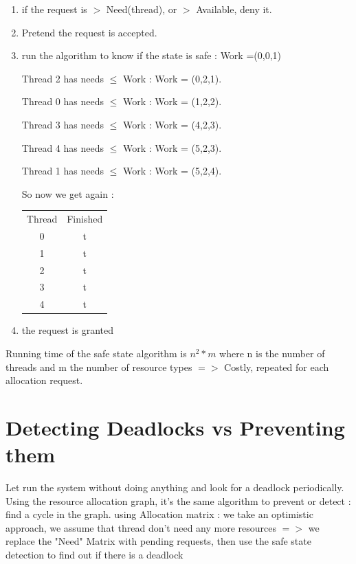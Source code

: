 \documentclass[a4paper,10pt]{article}
\begin{document}
\begin{enumerate}
  \item if the request is $>$ Need(thread), or $>$ Available, deny it.
  \item Pretend the request is accepted.
  \item run the algorithm to know if the state is safe : Work =(0,0,1)
  
Thread 2 has needs $\leq$ Work  : Work = (0,2,1).

Thread 0 has needs $\leq$ Work : Work = (1,2,2).

Thread 3 has needs $\leq$ Work : Work = (4,2,3).

Thread 4 has needs $\leq$ Work : Work = (5,2,3).

Thread 1 has needs $\leq$ Work : Work = (5,2,4).

So now we get again :

\begin{center}
    \begin{tabular}{cc}
      Thread & Finished\\
      0 & t\\
      1 & t\\
      2 & t\\
      3 & t\\
      4 & t\\
    \end{tabular}
  \end{center}
  
  \item the request is granted
\end{enumerate}

Running time of the safe state algorithm is $n^2*m$ where n is the number of threads and m the number of resource types $=>$ Costly, repeated for each allocation request.

\section{Detecting Deadlocks vs Preventing them}

Let run the system without doing anything and look for a deadlock periodically.
Using the resource allocation graph, it's the same algorithm to prevent or detect : find a cycle in the graph.
using Allocation matrix : we take an optimistic approach, we assume that thread don't need any more resources $=>$ we replace the "Need" Matrix with pending requests, then use the safe state detection to find out if there is a deadlock
\end{document}
